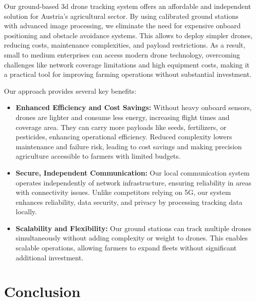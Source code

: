 Our ground-based \acrshort{3d} drone tracking system offers an affordable and independent solution for Austria's agricultural sector. By using calibrated ground stations with advanced image processing, we eliminate the need for expensive onboard positioning and obstacle avoidance systems. This allows to deploy simpler drones, reducing costs, maintenance complexities, and payload restrictions. As a result, small to medium enterprises can access modern drone technology, overcoming challenges like network coverage limitations and high equipment costs, making it a practical tool for improving farming operations without substantial investment.

Our approach provides several key benefits:

\begin{itemize} 
	\item \textbf{Enhanced Efficiency and Cost Savings:} Without heavy onboard sensors, drones are lighter and consume less energy, increasing flight times and coverage area. They can carry more payloads like seeds, fertilizers, or pesticides, enhancing operational efficiency. Reduced complexity lowers maintenance and failure risk, leading to cost savings and making precision agriculture accessible to farmers with limited budgets.
	
	\item \textbf{Secure, Independent Communication:} Our local communication system operates independently of network infrastructure, ensuring reliability in areas with connectivity issues. Unlike competitors relying on 5G, our system enhances reliability, data security, and privacy by processing tracking data locally.
	
	\item \textbf{Scalability and Flexibility:} Our ground stations can track multiple drones simultaneously without adding complexity or weight to drones. This enables scalable operations, allowing farmers to expand fleets without significant additional investment.

\end{itemize}

\section{Conclusion}


